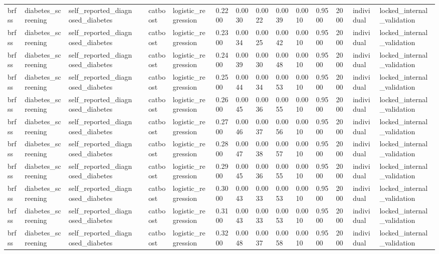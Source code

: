 \begin{tabular}{lllllllllllllll}
brfss & diabetes\_screening & self\_reported\_diagnosed\_diabetes &  & catboost & logistic\_regression & 0.2200 & 0.0030 & 0.0022 & 0.0039 & 0.0010 & 0.9500 & 2000 & individual & locked\_internal\_validation \\
brfss & diabetes\_screening & self\_reported\_diagnosed\_diabetes &  & catboost & logistic\_regression & 0.2300 & 0.0034 & 0.0025 & 0.0042 & 0.0010 & 0.9500 & 2000 & individual & locked\_internal\_validation \\
brfss & diabetes\_screening & self\_reported\_diagnosed\_diabetes &  & catboost & logistic\_regression & 0.2400 & 0.0039 & 0.0030 & 0.0048 & 0.0010 & 0.9500 & 2000 & individual & locked\_internal\_validation \\
brfss & diabetes\_screening & self\_reported\_diagnosed\_diabetes &  & catboost & logistic\_regression & 0.2500 & 0.0044 & 0.0034 & 0.0053 & 0.0010 & 0.9500 & 2000 & individual & locked\_internal\_validation \\
brfss & diabetes\_screening & self\_reported\_diagnosed\_diabetes &  & catboost & logistic\_regression & 0.2600 & 0.0045 & 0.0036 & 0.0055 & 0.0010 & 0.9500 & 2000 & individual & locked\_internal\_validation \\
brfss & diabetes\_screening & self\_reported\_diagnosed\_diabetes &  & catboost & logistic\_regression & 0.2700 & 0.0046 & 0.0037 & 0.0056 & 0.0010 & 0.9500 & 2000 & individual & locked\_internal\_validation \\
brfss & diabetes\_screening & self\_reported\_diagnosed\_diabetes &  & catboost & logistic\_regression & 0.2800 & 0.0047 & 0.0038 & 0.0057 & 0.0010 & 0.9500 & 2000 & individual & locked\_internal\_validation \\
brfss & diabetes\_screening & self\_reported\_diagnosed\_diabetes &  & catboost & logistic\_regression & 0.2900 & 0.0045 & 0.0036 & 0.0055 & 0.0010 & 0.9500 & 2000 & individual & locked\_internal\_validation \\
brfss & diabetes\_screening & self\_reported\_diagnosed\_diabetes &  & catboost & logistic\_regression & 0.3000 & 0.0043 & 0.0033 & 0.0053 & 0.0010 & 0.9500 & 2000 & individual & locked\_internal\_validation \\
brfss & diabetes\_screening & self\_reported\_diagnosed\_diabetes &  & catboost & logistic\_regression & 0.3100 & 0.0043 & 0.0033 & 0.0053 & 0.0010 & 0.9500 & 2000 & individual & locked\_internal\_validation \\
brfss & diabetes\_screening & self\_reported\_diagnosed\_diabetes &  & catboost & logistic\_regression & 0.3200 & 0.0048 & 0.0037 & 0.0058 & 0.0010 & 0.9500 & 2000 & individual & locked\_internal\_validation \\

\end{tabular}
